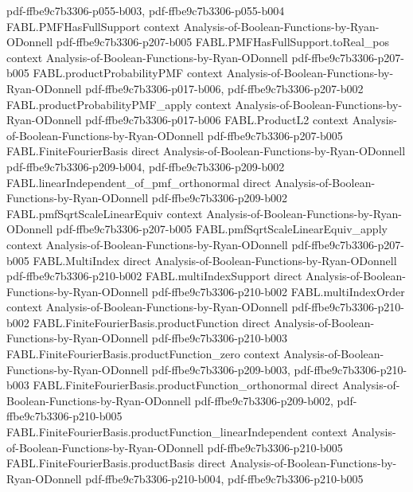 \begin{theorem}
  {pdf-ffbe9c7b3306-p055-b003,
    pdf-ffbe9c7b3306-p055-b004}
\proofstep
  {FABL.PMFHasFullSupport}
  {context}
  {Analysis-of-Boolean-Functions-by-Ryan-ODonnell}
  {pdf-ffbe9c7b3306-p207-b005}
\proofstep
  {FABL.PMFHasFullSupport.toReal_pos}
  {context}
  {Analysis-of-Boolean-Functions-by-Ryan-ODonnell}
  {pdf-ffbe9c7b3306-p207-b005}
\proofstep
  {FABL.productProbabilityPMF}
  {context}
  {Analysis-of-Boolean-Functions-by-Ryan-ODonnell}
  {pdf-ffbe9c7b3306-p017-b006,
    pdf-ffbe9c7b3306-p207-b002}
\proofstep
  {FABL.productProbabilityPMF_apply}
  {context}
  {Analysis-of-Boolean-Functions-by-Ryan-ODonnell}
  {pdf-ffbe9c7b3306-p017-b006}
\proofstep
  {FABL.ProductL2}
  {context}
  {Analysis-of-Boolean-Functions-by-Ryan-ODonnell}
  {pdf-ffbe9c7b3306-p207-b005}
\proofstep
  {FABL.FiniteFourierBasis}
  {direct}
  {Analysis-of-Boolean-Functions-by-Ryan-ODonnell}
  {pdf-ffbe9c7b3306-p209-b004,
    pdf-ffbe9c7b3306-p209-b002}
\proofstep
  {FABL.linearIndependent_of_pmf_orthonormal}
  {direct}
  {Analysis-of-Boolean-Functions-by-Ryan-ODonnell}
  {pdf-ffbe9c7b3306-p209-b002}
\proofstep
  {FABL.pmfSqrtScaleLinearEquiv}
  {context}
  {Analysis-of-Boolean-Functions-by-Ryan-ODonnell}
  {pdf-ffbe9c7b3306-p207-b005}
\proofstep
  {FABL.pmfSqrtScaleLinearEquiv_apply}
  {context}
  {Analysis-of-Boolean-Functions-by-Ryan-ODonnell}
  {pdf-ffbe9c7b3306-p207-b005}
\proofstep
  {FABL.MultiIndex}
  {direct}
  {Analysis-of-Boolean-Functions-by-Ryan-ODonnell}
  {pdf-ffbe9c7b3306-p210-b002}
\proofstep
  {FABL.multiIndexSupport}
  {direct}
  {Analysis-of-Boolean-Functions-by-Ryan-ODonnell}
  {pdf-ffbe9c7b3306-p210-b002}
\proofstep
  {FABL.multiIndexOrder}
  {context}
  {Analysis-of-Boolean-Functions-by-Ryan-ODonnell}
  {pdf-ffbe9c7b3306-p210-b002}
\proofstep
  {FABL.FiniteFourierBasis.productFunction}
  {direct}
  {Analysis-of-Boolean-Functions-by-Ryan-ODonnell}
  {pdf-ffbe9c7b3306-p210-b003}
\proofstep
  {FABL.FiniteFourierBasis.productFunction_zero}
  {context}
  {Analysis-of-Boolean-Functions-by-Ryan-ODonnell}
  {pdf-ffbe9c7b3306-p209-b003,
    pdf-ffbe9c7b3306-p210-b003}
\proofstep
  {FABL.FiniteFourierBasis.productFunction_orthonormal}
  {direct}
  {Analysis-of-Boolean-Functions-by-Ryan-ODonnell}
  {pdf-ffbe9c7b3306-p209-b002,
    pdf-ffbe9c7b3306-p210-b005}
\proofstep
  {FABL.FiniteFourierBasis.productFunction_linearIndependent}
  {context}
  {Analysis-of-Boolean-Functions-by-Ryan-ODonnell}
  {pdf-ffbe9c7b3306-p210-b005}
\proofstep
  {FABL.FiniteFourierBasis.productBasis}
  {direct}
  {Analysis-of-Boolean-Functions-by-Ryan-ODonnell}
  {pdf-ffbe9c7b3306-p210-b004,
    pdf-ffbe9c7b3306-p210-b005}

\end{theorem}
